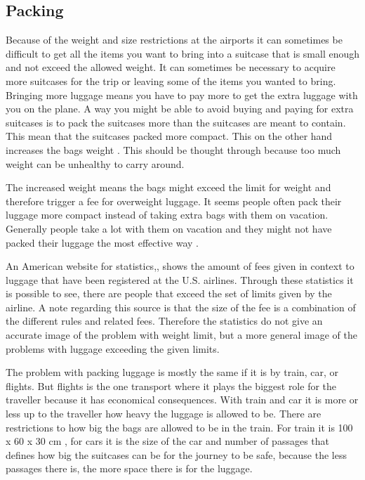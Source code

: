 \subsection*{Packing}

Because of the weight and size restrictions at the airports it can sometimes be difficult to get all the items you want to bring into a suitcase that is small enough and not exceed the allowed weight. It can sometimes be necessary to acquire more suitcases for the trip or leaving some of the items you wanted to bring. 
Bringing more luggage means you have to pay more to get the extra luggage with you on the plane. A way you might be able to avoid buying and paying for extra suitcases is to pack the suitcases more than the suitcases are meant to contain. This mean that the suitcases packed more compact. This on the other hand increases the bags weight \citep{altombag}. This should be thought through because too much weight can be unhealthy to carry around.

The increased weight means the bags might exceed the limit for weight and therefore trigger a fee for overweight luggage.
It seems people often pack their luggage more compact instead of taking extra bags with them on vacation. Generally people take a lot with them on vacation and they might not have packed their luggage the most effective way \citep{airstat}.

An American website for statistics,\citep{airstat}, shows the amount of fees given in context to luggage that have been registered at the U.S. airlines. Through these statistics it is possible to see, there are people that exceed the set of limits given by the airline. A note regarding this source is that the size of the fee is a combination of the different rules and related fees. Therefore the statistics do not give an accurate image of the problem with weight limit, but a more general image of the problems with luggage exceeding the given limits.

The problem with packing luggage is mostly the same if it is by train, car, or flights. But flights is the one transport where it plays the biggest role for the traveller because it has economical consequences. With train and car it is more or less up to the traveller how heavy the luggage is allowed to be. There are restrictions to how big the bags are allowed to be in the train. For train it is 100 x 60 x 30 cm \citep{rulestrain}, for cars it is the size of the car and number of passages that defines how big the suitcases can be for the journey to be safe, because the less passages there is, the more space there is for the luggage.

